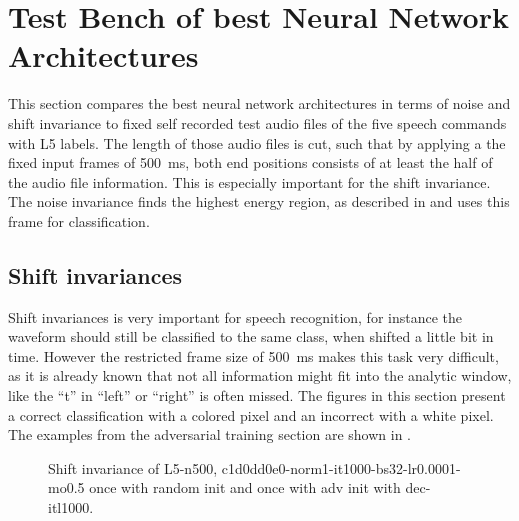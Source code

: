 
\section{Test Bench of best Neural Network Architectures}\label{sec:exp_tb}
\thesisStateNotReady
This section compares the best neural network architectures in terms of noise and shift invariance to fixed self recorded test audio files of the five speech commands with L5 labels.
The length of those audio files is cut, such that by applying a the fixed input frames of \SI{500}{\milli\second}, both end positions consists of at least the half of the audio file information.
This is especially important for the shift invariance.
The noise invariance finds the highest energy region, as described in  and uses this frame for classification.


\subsection{Shift invariances}
Shift invariances is very important for speech recognition, for instance the waveform should still be classified to the same class, when shifted a little bit in time.
However the restricted frame size of \SI{500}{\milli\second} makes this task very difficult, as it is already known that not all information might fit into the analytic window, like the \enquote{t} in \enquote{left} or \enquote{right} is often missed.
The figures in this section present a correct classification with a colored pixel and an incorrect with a white pixel.
The examples from the adversarial training section are shown in .
\begin{figure}[!ht]
  \centering
  \caption{Shift invariance of L5-n500, c1d0dd0e0-norm1-it1000-bs32-lr0.0001-mo0.5 once with random init and once with adv init with dec-itl1000.}
  \label{fig:exp_tb_shift_fc3}
\end{figure}
\FloatBarrier
\noindent


